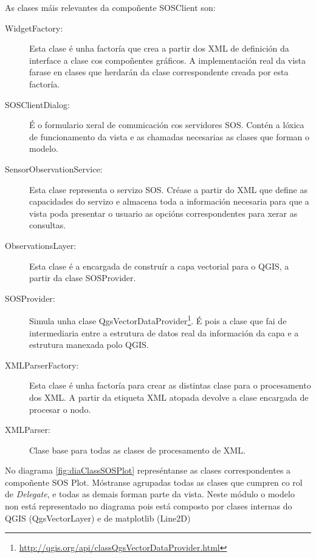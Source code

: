 As clases máis relevantes da compoñente SOSClient son:
\begin{description}
\item[WidgetFactory:] Esta clase é unha factoría que crea a partir dos XML de definición da interface a clase cos compoñentes gráficos. A implementación real da vista farase en clases que herdarán da clase correspondente creada por esta factoría.
\item[SOSClientDialog:] É o formulario xeral de comunicación cos servidores SOS. Contén a lóxica de funcionamento da vista e as chamadas necesarias as clases que forman o modelo.
\item[SensorObservationService:] Esta clase representa o servizo SOS. Créase a partir do XML que define as capacidades do servizo e almacena toda a información necesaria para que a vista poda presentar o usuario as opcións correspondentes para xerar as consultas.
\item[ObservationsLayer:] Esta clase é a encargada de construír a capa vectorial para o QGIS, a partir da clase SOSProvider.
\item[SOSProvider:] Simula unha clase QgsVectorDataProvider\footnote{\url{http://qgis.org/api/classQgsVectorDataProvider.html}}. É pois a clase que fai de intermediaria entre a estrutura de datos real da información da capa e a estrutura manexada polo QGIS.
\item[XMLParserFactory:] Esta clase é unha factoría para crear as distintas clase para o procesamento dos XML. A partir da etiqueta XML atopada devolve a clase encargada de procesar o nodo.
\item[XMLParser:] Clase base para todas as clases de procesamento de XML.
\end{description}

No diagrama \ref{fig:diaClassSOSPlot} represéntanse as clases correspondentes a compoñente SOS Plot. Móstranse agrupadas todas as clases que cumpren co rol de \emph{Delegate}, e todas as demais forman parte da vista. Neste módulo o modelo non está representado no diagrama pois está composto por clases internas do QGIS (QgsVectorLayer) e de matplotlib (Line2D)

